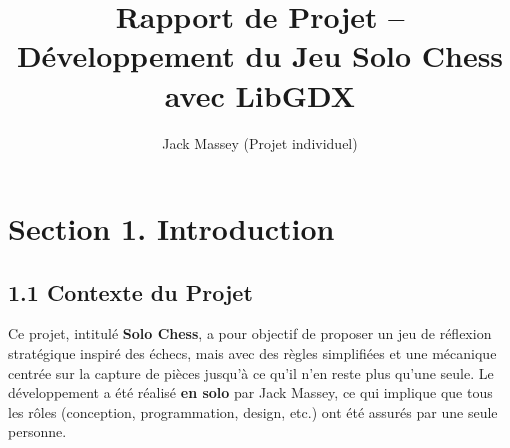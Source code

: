 \documentclass[11pt,a4paper]{article}
\title{Rapport de Projet – Développement du Jeu Solo Chess avec LibGDX}
\author{Jack Massey (Projet individuel)}
\date{}
\begin{document}
\maketitle

\section*{Section 1. Introduction}

\subsection*{1.1 Contexte du Projet}
Ce projet, intitulé \textbf{Solo Chess}, a pour objectif de proposer un jeu de réflexion stratégique inspiré des échecs, mais avec des règles simplifiées et une mécanique centrée sur la capture de pièces jusqu’à ce qu’il n’en reste plus qu’une seule. Le développement a été réalisé \textbf{en solo} par Jack Massey, ce qui implique que tous les rôles (conception, programmation, design, etc.) ont été assurés par une seule personne.
\end{document}
